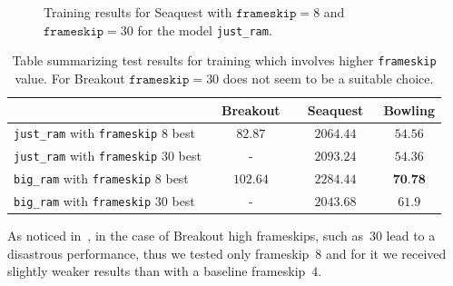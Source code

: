 \begin{figure}[h]
\centering
{}
\caption{Training results for Seaquest with 
$\texttt{frameskip} = 8$ and  $\texttt{frameskip} = 30$ for the model \texttt{just\_ram}.}
\label{fig:seaquest-frameskip}
\end{figure}

\begin{table}[h]
\centering
\begin{tabularx}{0.9\textwidth}{ X c c c }
  \toprule
   &\ Breakout\ &\ Seaquest\ & Bowling \\
  \midrule
  \texttt{just\_ram} with \texttt{frameskip} $8$ best & $82.87$  & $2064.44$ & $54.56$\\
  \texttt{just\_ram} with \texttt{frameskip} $30$ best & -  & $2093.24$ & $54.36$\\
  \texttt{big\_ram} with \texttt{frameskip} $8$ best & $102.64$ & $2284.44$ & $\textbf{70.78}$ \\
  \texttt{big\_ram} with \texttt{frameskip} $30$ best & - & $2043.68$ & $61.9$\\
  \bottomrule
\end{tabularx}
\caption{Table summarizing test results for training which involves higher \texttt{frameskip} value. For Breakout $\texttt{frameskip} 
=30$ does not seem to be a suitable choice.}
\label{table:results-frameskip}
\end{table}

As noticed in~\cite{frameskip}, in the case of Breakout high frameskips, such as~$30$ lead to a disastrous performance, thus we tested only frameskip~$8$ and for it we received slightly weaker results than with a baseline frameskip~$4$.

